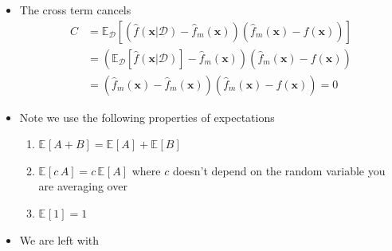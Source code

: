\documentclass[11pt]{article}
\newcommand{\av}[2][]{\mathbb{E}_{#1\!}\left[ #2 \right]}
\newcounter{eqCounter}
\newcommand{\explanation}{\setcounter{eqCounter}{0}\renewcommand{\labelenumi}{(\arabic{enumi})}}
\begin{document}
\begin{itemize}
\begin{itemize}
\begin{align*}
      \av[\mathcal{D}]{ 
      \left(\hat{f}(\bm{x}\vert \mathcal{D}) -
      \hat{f}_m(\bm{x}) \right)^2 + \left(
      \hat{f}_m(\bm{x}) - f(\bm{x}) \right)^2 }  \\
    & \hspace{5cm} + 2 \, \av[\mathcal{D}]{
      \left(\hat{f}(\bm{x}\vert \mathcal{D}) -
      \hat{f}_m(\bm{x}) \right)\left(
      \hat{f}_m(\bm{x}) - f(\bm{x}) \right) } \Biggr)
    \end{align*}
\explanation
\begin{enumerate}
\item This is the definition of the expected generalisation loss, \(\bar{L}_G\)
\item The generalisation loss is the squared difference between
the prediction of the learning machine,
\(\hat{f}(\bm{x}\vert \mathcal{D})\), and the true function,
\(f(\bm{x})\), averaged over all possible input feature vectors,
\(\bm{x}\), weighted by the probability of the input, \(p(\bm{x})\)
\item We exchange the sum and expectation
\item We add and subtract the prediction of the mean machine
\item We expand out the sum
\end{enumerate}
\item The cross term cancels
\begin{align*}
C &= \av[\mathcal{D}]{ \left(\hat{f}(\bm{x}\vert \mathcal{D}) -
   	 \hat{f}_m(\bm{x}) \right)\left(
   	 \hat{f}_m(\bm{x}) - f(\bm{x}) \right) }\\
&= \left(\av[\mathcal{D}]{\hat{f}(\bm{x}\vert \mathcal{D})} -
   	 \hat{f}_m(\bm{x}) \right)\left(
   	 \hat{f}_m(\bm{x}) - f(\bm{x}) \right)\\
&= \left(\hat{f}_m(\bm{x}) -
   	 \hat{f}_m(\bm{x}) \right)\left(
   	 \hat{f}_m(\bm{x}) - f(\bm{x}) \right) = 0
\end{align*}
\item Note we use the following properties of expectations
\begin{enumerate}
\item \(\av{A + B} = \av{A} + \av{B}\)
\item \(\av{c\,A} = c\,\av{A}\) where \(c\) doesn't depend on the
random variable you are averaging over
\item \(\av{1} = 1\)
\end{enumerate}
\item We are left with
  \begin{align*}

\end{align*}
\end{itemize}
\end{itemize}
\end{document}
